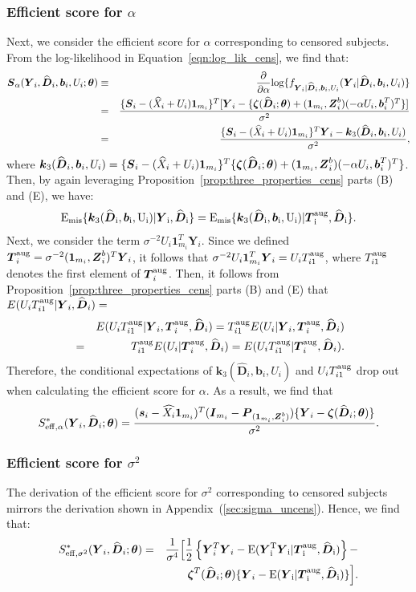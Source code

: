 \documentclass[12pt]{article}
\def\log{\hbox{log}}
\def\bse{\begin{eqnarray*}}
\def\ese{\end{eqnarray*}}
\def\bse{\begin{eqnarray*}}
\def\ese{\end{eqnarray*}}
\def\bS{{\mathbf S}}
\newcommand{\bzeta}{\mbox{\boldmath $\zeta$}}
\def\btheta{{\boldsymbol{\theta}}}
\def\bone{{\boldsymbol{1}}}
\def\bb{{\boldsymbol b}}
\def\bk{{\boldsymbol k}}
\def\bs{{\boldsymbol s}}
\def\bD{{\boldsymbol D}}
\def\bI{{\boldsymbol I}}
\def\bP{{\boldsymbol P}}
\def\bS{{\boldsymbol S}}
\def\bT{{\boldsymbol T}}
\def\bY{{\boldsymbol Y}}
\def\bZ{{\boldsymbol Z}}
\def\tilD{\bD}
\def\E{\rm E}
\begin{document}
\subsubsection{Efficient score for $\alpha$}
Next, we consider the efficient score for $\alpha$ corresponding to censored subjects.
From the log-likelihood in Equation~\eqref{eqn:log_lik_cens}, we find that: 
\bse
\bS_{\alpha}(\bY_i,\widehat{\tilD}_i,\bb_i,U_i;\btheta)&\equiv&\frac{\partial}{\partial\alpha}\log\{ f_{\bY_i|\widehat{\tilD}_i,\bb_i,U_i}(\bY_i|\widehat{\tilD}_i,\bb_i,U_i)\}\\
&=&\frac{\{\bS_i-(\widehat{X}_i+U_i)\bone_{m_i}\}^T[\bY_i-\{\bzeta(\widehat{\tilD}_i;\btheta) + (\bone_{m_i},\bZ_i^b)(-\alpha U_i, \bb_i^T)^T\}]}{\sigma^2}\\
&=&\frac{\{\bS_i-(\widehat{X}_i+U_i)\bone_{m_i}\}^T\bY_i-\bk_3(\widehat{\tilD}_i,\bb_i,U_i)}{\sigma^2},
\ese
where $\bk_3(\widehat{\tilD}_i,\bb_i,U_i)=\{\bS_i-(\widehat{X}_i+U_i)\bone_{m_i}\}^T\{\bzeta(\widehat{\tilD}_i;\btheta) + (\bone_{m_i},\bZ_i^b)(-\alpha U_i, \bb_i^T)^T\}$. Then, by again leveraging Proposition~\ref{prop:three_properties_cens} parts (B) and (E), we have:
\bse
\E_{\rm{mis}}\{\bk_3(\widehat{\tilD}_i,\bb_i,U_i)|\bY_i,\widehat{\tilD}_i\}
=\E_{\rm{mis}}\{\bk_3(\widehat{\tilD}_i,\bb_i,U_i)|\bT_i^{\rm aug},\widehat{\tilD}_i\}.
\ese
Next, we consider the term $\sigma^{-2}U_i\bone_{m_i}^T\bY_i$. Since we defined $\bT_i^{\rm aug}= \sigma^{-2}(\bone_{m_i},\bZ^b_i)^T\bY_i$, it follows that $\sigma^{-2}U_i\bone_{m_i}^T\bY_i=U_iT_{i1}^{\rm aug}$, where $T^{\rm aug}_{i1}$ denotes the first element of $\bT_i^{\rm aug}$. Then, it follows from Proposition~\ref{prop:three_properties_cens} parts (B) and (E) that $E(U_iT_{i1}^{\rm aug}|\bY_i,\widehat{\tilD}_i)=$
\bse
&&E(U_iT_{i1}^{\rm aug}|\bY_i,\bT_i^{\rm aug},\widehat{\tilD}_i)=T_{i1}^{\rm aug}E(U_i|\bY_i,\bT_i^{\rm aug},\widehat{\tilD}_i)\\
&=&T_{i1}^{\rm aug}E(U_i|\bT_i^{\rm aug},\widehat{\tilD}_i)=E(U_iT_{i1}^{\rm aug}|\bT_i^{\rm aug},\widehat{\tilD}_i).
\ese
Therefore, the conditional expectations of $\bk_3(\widehat{\tilD}_i,\bb_i,U_i)$ and $U_iT_{i1}^{\rm aug}$ drop out when calculating the efficient score for $\alpha$. As a result, we find that
\bse
S_{\rm{eff},\alpha}^*(\bY_i,\widehat{\tilD}_i;\btheta)=\frac{(\bs_i-\widehat{X_i}\bone_{m_i})^T(\bI_{m_i}-\bP_{(\bone_{m_i},\bZ^b_i)})\{\bY_i-\bzeta(\widehat{\tilD}_i;\btheta)\}}{\sigma^2}.
\ese
\subsubsection{Efficient score for $\sigma^2$}
The derivation of the efficient score for $\sigma^2$ corresponding to censored subjects mirrors the derivation shown in Appendix~(\ref{sec:sigma_uncens}). Hence, we find that:
\bse
S_{\rm{eff},\sigma^2}^*(\bY_i,\widehat{\tilD}_i;\btheta)
&=&\frac{1}{\sigma^4}\Big[\frac{1}{2}\left\{\bY_i^T\bY_i-\E(\bY_i^T\bY_i|\bT_i^{\rm aug},\widehat{\tilD}_i)\right\}-\\
&&\bzeta^T(\widehat{\tilD}_i;\btheta)\{\bY_i-\E(\bY_i|\bT_i^{\rm aug},\widehat{\tilD}_i)\}\Big].
\ese
\end{document}
